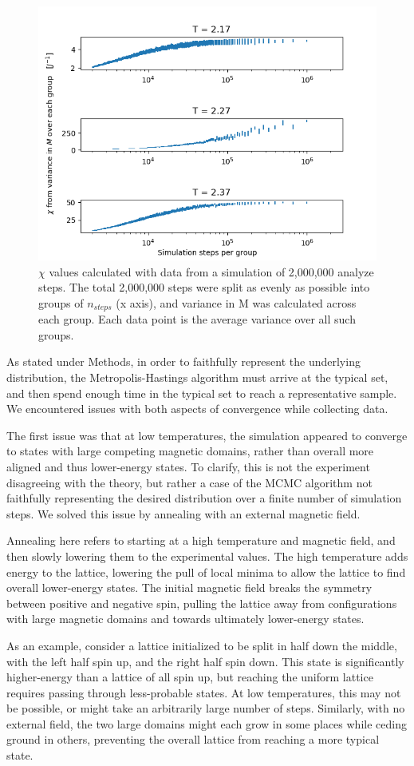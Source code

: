 \documentclass[letter,scriptaddress,twocolumn, prl,nofootinbib]{revtex4}
\begin{document}
\begin{figure}[h]
	\begin{center}
		\includegraphics[width=.4\textwidth]{figs/figA1.png}
		\caption{$\chi$ values calculated with data from a simulation of 2,000,000 analyze steps. The total 2,000,000 steps were split as evenly as possible into groups of $n_{steps}$ (x axis), and variance in M was calculated across each group. Each data point is the average variance over all such groups.}
		\label{fig:figA1}
	\end{center}
\end{figure}

As stated under Methods, in order to faithfully represent the underlying distribution, the Metropolis-Hastings algorithm must arrive at the typical set, and then spend enough time in the typical set to reach a representative sample. We encountered issues with both aspects of convergence while collecting data.

The first issue was that at low temperatures, the simulation appeared to converge to states with large competing magnetic domains, rather than overall more aligned and thus lower-energy states. To clarify, this is not the experiment disagreeing with the theory, but rather a case of the MCMC algorithm not faithfully representing the desired distribution over a finite number of simulation steps. We solved this issue by annealing with an external magnetic field.

Annealing here refers to starting at a high temperature and magnetic field, and then slowly lowering them to the experimental values. The high temperature adds energy to the lattice, lowering the pull of local minima to allow the lattice to find overall lower-energy states. The initial magnetic field breaks the symmetry between positive and negative spin, pulling the lattice away from configurations with large magnetic domains and towards ultimately lower-energy states. 

As an example, consider a lattice initialized to be split in half down the middle, with the left half spin up, and the right half spin down. This state is significantly higher-energy than a lattice of all spin up, but reaching the uniform lattice requires passing through less-probable states. At low temperatures, this may not be possible, or might take an arbitrarily large number of steps. Similarly, with no external field, the two large domains might each grow in some places while ceding ground in others, preventing the overall lattice from reaching a more typical state.
\end{document}
